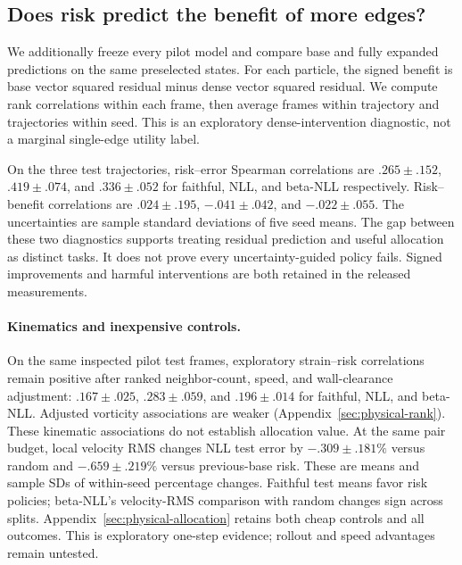 \subsection{Does risk predict the benefit of more edges?}
We additionally freeze every pilot model and compare base and fully expanded predictions on the same preselected states. For each particle, the signed benefit is base vector squared residual minus dense vector squared residual. We compute rank correlations within each frame, then average frames within trajectory and trajectories within seed. This is an exploratory dense-intervention diagnostic, not a marginal single-edge utility label.

On the three test trajectories, risk--error Spearman correlations are $.265\pm.152$, $.419\pm.074$, and $.336\pm.052$ for faithful, NLL, and beta-NLL respectively. Risk--benefit correlations are $.024\pm.195$, $-.041\pm.042$, and $-.022\pm.055$. The uncertainties are sample standard deviations of five seed means. The gap between these two diagnostics supports treating residual prediction and useful allocation as distinct tasks. It does not prove every uncertainty-guided policy fails. Signed improvements and harmful interventions are both retained in the released measurements.

\paragraph{Kinematics and inexpensive controls.}
On the same inspected pilot test frames, exploratory strain--risk correlations remain positive after ranked neighbor-count, speed, and wall-clearance adjustment: $.167\pm.025$, $.283\pm.059$, and $.196\pm.014$ for faithful, NLL, and beta-NLL. Adjusted vorticity associations are weaker (Appendix~\ref{sec:physical-rank}). These kinematic associations do not establish allocation value. At the same pair budget, local velocity RMS changes NLL test error by $-.309\pm.181\%$ versus random and $-.659\pm.219\%$ versus previous-base risk. These are means and sample SDs of within-seed percentage changes. Faithful test means favor risk policies; beta-NLL's velocity-RMS comparison with random changes sign across splits. Appendix~\ref{sec:physical-allocation} retains both cheap controls and all outcomes. This is exploratory one-step evidence; rollout and speed advantages remain untested.

